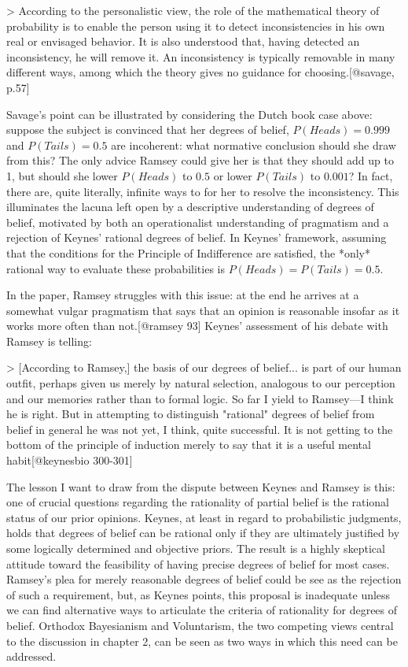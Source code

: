 \textgreater{} According to the personalistic view, the role of the
mathematical theory of probability is to enable the person using it to
detect inconsistencies in his own real or envisaged behavior. It is also
understood that, having detected an inconsistency, he will remove it. An
inconsistency is typically removable in many different ways, among which
the theory gives no guidance for choosing.{[}@savage, p.57{]}

Savage's point can be illustrated by considering the Dutch book case
above: suppose the subject is convinced that her degrees of belief,
\(P(Heads) = 0.999\) and \(P(Tails) = 0.5\) are incoherent: what
normative conclusion should she draw from this? The only advice Ramsey
could give her is that they should add up to 1, but should she lower
\(P(Heads)\) to \(0.5\) or lower \(P(Tails)\) to \(0.001\)? In fact,
there are, quite literally, infinite ways to for her to resolve the
inconsistency. This illuminates the lacuna left open by a descriptive
understanding of degrees of belief, motivated by both an operationalist
understanding of pragmatism and a rejection of Keynes' rational degrees
of belief. In Keynes' framework, assuming that the conditions for the
Principle of Indifference are satisfied, the *only* rational way to
evaluate these probabilities is \(P(Heads) = P(Tails) = 0.5\).

In the paper, Ramsey struggles with this issue: at the end he arrives at
a somewhat vulgar pragmatism that says that an opinion is reasonable
insofar as it works more often than not.{[}@ramsey 93{]} Keynes'
assessment of his debate with Ramsey is telling:

\textgreater{} {[}According to Ramsey,{]} the basis of our degrees of
belief... is part of our human outfit, perhaps given us merely by
natural selection, analogous to our perception and our memories rather
than to formal logic. So far I yield to Ramsey---I think he is right.
But in attempting to distinguish "rational" degrees of belief from
belief in general he was not yet, I think, quite successful. It is not
getting to the bottom of the principle of induction merely to say that
it is a useful mental habit{[}@keynesbio 300-301{]}

The lesson I want to draw from the dispute between Keynes and Ramsey is
this: one of crucial questions regarding the rationality of partial
belief is the rational status of our prior opinions. Keynes, at least in
regard to probabilistic judgments, holds that degrees of belief can be
rational only if they are ultimately justified by some logically
determined and objective priors. The result is a highly skeptical
attitude toward the feasibility of having precise degrees of belief for
most cases. Ramsey's plea for merely reasonable degrees of belief could
be see as the rejection of such a requirement, but, as Keynes points,
this proposal is inadequate unless we can find alternative ways to
articulate the criteria of rationality for degrees of belief. Orthodox
Bayesianism and Voluntarism, the two competing views central to the
discussion in chapter 2, can be seen as two ways in which this need can
be addressed.

